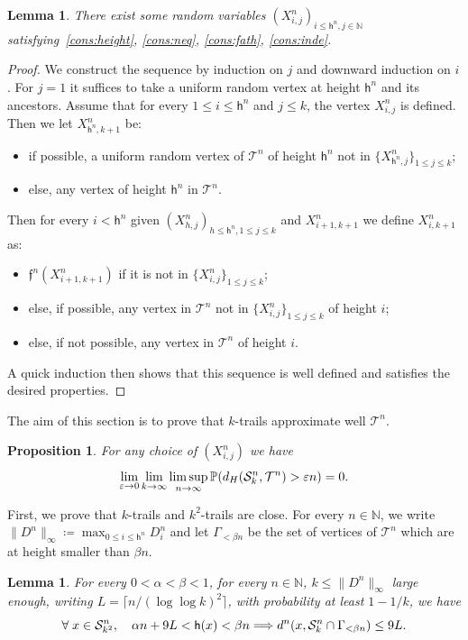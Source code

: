 \documentclass[10pt]{amsart}
\newtheorem{lemm}[theo]{Lemma}\newtheorem{prop}[theo]{Proposition}\newtheorem{coro}[theo]{Corollary}\newtheorem{conj}[theo]{Conjecture}
\theoremstyle{definition}\newtheorem{defi}[theo]{Definition}\newtheorem{rema}[theo]{Remark}\newtheorem{exam}[theo]{Example}\newtheorem{exem}[theo]{Example}\newtheorem{nota}[theo]{Notation}
\newcommand{\proba}[1]{\mathbb{P}\left(#1\right)}
\newcommand{\e}{\varepsilon}
\newcommand{\N}{\mathbb{N}}
\newcommand{\1}{\mathbbm{1}}
\newcommand{\fath}{\mathfrak{f}}
\newcommand{\trail}{\mathcal{S}}
\newcommand{\T}{\mathcal{T}}
\newcommand{\h}{\mathsf{h}}
\let\originalleft\left
\let\originalright\right
\renewcommand{\left}{\mathopen{}\mathclose\bgroup\originalleft}
\renewcommand{\right}{\aftergroup\egroup\originalright}
\renewcommand*{\to}{\mathchoice{\longrightarrow}{\rightarrow}{\rightarrow}{\rightarrow}}
\renewcommand*{\implies}{\mathchoice{\Longrightarrow}{\Rightarrow}{\Rightarrow}{\Rightarrow}}
\let\oldforall\forall
\renewcommand*{\forall}{\mathrel{\oldforall}}
\begin{document}
\begin{lemm}\label{lem:trailconstruct}
There exist some random variables $(X^n_{i,j})_{i\leq \h^n,j\in \N}$ satisfying~\ref{cons:height}, \ref{cons:neq}, \ref{cons:fath}, \ref{cons:inde}.
\end{lemm}

\begin{proof}
We construct the sequence by induction on $j$ and downward induction on $i$. For $j=1$ it suffices to take a uniform random vertex at height $\h^n$ and its ancestors. Assume that for every $1\leq i \leq \h^n$ and $j\leq k$, the vertex $X^n_{i,j}$ is defined. Then we let $X_{\h^n,k+1}^n$ be:
\begin{itemize}
\item if possible, a uniform random vertex of $\T^n$ of height $\h^n$ not in $\{X_{\h^n,j}^n\}_{1\leq j \leq k}$;
\item else, any vertex of height $\h^n$ in $\T^n$.
\end{itemize}
Then for every $i<\h^n$ given $(X_{h,j}^n)_{h\leq \h^n, 1\leq j\leq k}$ and $X_{i+1,k+1}^n$ we define $X_{i,k+1}^n$ as:
\begin{itemize}
\item $\fath^n(X_{i+1,k+1}^n)$ if it is not in $\{X_{i,j}^n\}_{1\leq j \leq k}$;
\item else, if possible, any vertex in $\T^n$ not in $\{X_{i,j}^n\}_{1\leq j \leq k}$ of height $i$;
\item else, if not possible, any vertex in $\T^n$ of height $i$.
\end{itemize}
A quick induction then shows that this sequence is well defined and satisfies the desired properties.
\end{proof}

The aim of this section is to prove that $k$-trails approximate well $\T^n$.

\begin{prop}\label{pro:chain}
For any choice of $(X_{i,j}^n)$ we have
\[
\lim_{\e \to 0} \lim_{k\to \infty} \limsup_{n\to \infty} \proba{d_H(\trail_k^n,\T^n)>\e n}=0.
\]
\end{prop}

First, we prove that $k$-trails and $k^2$-trails are close. For every $n\in \N$, we write $\|D^n\|_\infty \coloneqq\max_{0\leq i \leq \h^n} D_i^n$ and let $\Gamma_{<\beta n}$ be the set of vertices of $\T^n$ which are at height smaller than $\beta n$.

\begin{lemm}\label{lem:chain}
For every $0<\alpha<\beta<1$, for every $n\in \N$, $k\leq \|D^n\|_\infty$ large enough, writing $L=\lceil n/(\log\log k)^2\rceil$, with probability at least $1-1/k$, we have
\[
\forall x\in \trail_{k^2}^n,\quad \alpha n+9L<\h(x)<\beta n \implies d^n\left(x,\trail_{k}^n \cap \Gamma_{<\beta n}\right)\leq 9 L.
\]
\end{lemm}
\end{document}
